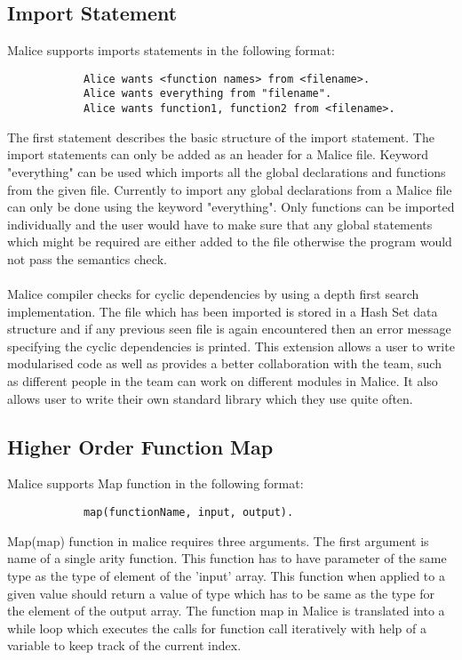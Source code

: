 \documentclass[a4wide, 11pt]{article}
\begin{document}
	\subsection{Import Statement}
		Malice supports imports statements in the following format:
		\begin{verbatim}
		    Alice wants <function names> from <filename>.
		    Alice wants everything from "filename".
		    Alice wants function1, function2 from <filename>.
		\end{verbatim}
		The first statement describes the basic structure of the import statement. The import statements can only be added as an header for a 
		Malice file. Keyword "everything" can be used which imports all the global declarations and functions from the given file. 
		Currently to import any global declarations from a Malice file can only be done using the keyword "everything". Only functions can be
		imported individually and the user would have to make sure that any global statements which might be required are either added to the 
		file otherwise the program would not pass the semantics check. 
		\\
		\\
		Malice compiler checks for cyclic dependencies by using a depth first search implementation. The file which has been imported is stored
		in a Hash Set data structure and if any previous seen file is again encountered then an error message specifying the cyclic dependencies
		is printed. This extension allows a user to write modularised code as well as provides a better collaboration with the team, such as
		different people in the team can work on different modules in Malice. It also allows user to write their own standard library which they
		use quite often.

	\subsection{Higher Order Function Map}
		Malice supports Map function in the following format:
		\begin{verbatim}
		    map(functionName, input, output).
		\end{verbatim}
		Map(map) function in malice requires three arguments. The first argument is name of a single arity function. This function has
		to have parameter of the same type as the type of element of the 'input' array. This function when applied to a given value should
		return a value of type which has to be same as the type for the element of the output array. The function map in Malice is translated
		into a while loop which executes the calls for function call iteratively with help of a variable to keep track of the current index.
		
\end{document}
